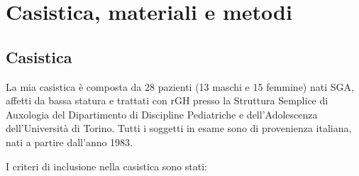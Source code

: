 \chapter{Casistica, materiali e metodi}

\section{Casistica}

La mia casistica è composta da 28 pazienti (13 maschi e 15 femmine) nati SGA, affetti da bassa statura e trattati con rGH presso la Struttura Semplice di Auxologia del Dipartimento di Discipline Pediatriche e dell'Adolescenza dell'Università  di Torino. Tutti i soggetti in esame sono di provenienza italiana, nati a partire dall'anno 1983.

I criteri di inclusione nella casistica sono stati:

